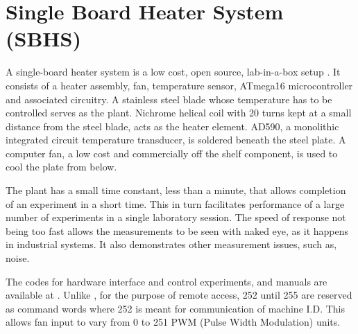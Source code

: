 \section{Single Board Heater System (SBHS)}
A single-board heater system is a low cost, open source, lab-in-a-box
setup \cite{ia010}.  It consists of a heater assembly, fan,
temperature sensor, ATmega16 microcontroller and associated
circuitry. A stainless steel blade whose temperature has to be
controlled serves as the plant.  Nichrome helical coil with 20 turns
kept at a small distance from the steel blade, acts as the heater
element.  AD590, a monolithic integrated circuit temperature
transducer, is soldered beneath the steel plate.  A computer fan, a
low cost and commercially off the shelf component, is used to cool the
plate from below.

The plant has a small time constant, less than a minute, that allows
completion of an experiment in a short time.  This in turn facilitates
performance of a large number of experiments in a single laboratory
session.  The speed of response not being too fast allows the
measurements to be seen with naked eye, as it happens in industrial
systems.  It also demonstrates other measurement issues, such as,
noise. 

The codes for hardware interface and control experiments, and manuals
are available at \cite{vl010,moodle}.  Unlike \cite{ia010}, for the
purpose of remote access, 252 until 255 are reserved as command words
where 252 is meant for communication of machine I.D. This allows fan
input to vary from 0 to 251 PWM (Pulse Width Modulation) units. 
